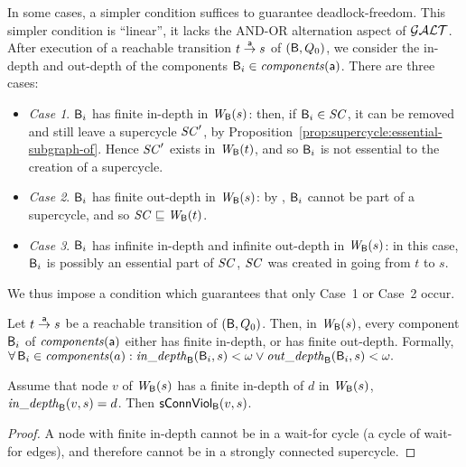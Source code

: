 In some cases, a simpler condition suffices to guarantee deadlock-freedom. This simpler condition is ``linear'', \ie it lacks the AND-OR alternation
aspect of $\GAO$. After execution of a reachable transition $t \goesto[\act] s$ of $(\B, Q_0)$, 
we consider the in-depth and out-depth of the components $\B_i \in \cmps{\act}$. There are three cases:
%
\begin{itemize}

\item \emph{Case 1}. \label{case:finite-in} $\B_i$ has finite in-depth in $\wfg{\B}{s}$: then, if $\B_i \in \SC$, it can be removed and still leave a
  supercycle $\SC'$, by Proposition~\ref{prop:supercycle:essential-subgraph-of}. Hence $\SC'$ exists in $\wfg{\B}{t}$, and so $\B_i$ is not essential
  to the creation of a supercycle.

\item \emph{Case 2}. \label{case:finite-out} $\B_i$ has finite out-depth in $\wfg{\B}{s}$: by , $\B_i$ cannot be
  part of a supercycle, and so $\SC \subg \wfg{\B}{t}$.

\item \emph{Case 3}. \label{case:infinite-both} $\B_i$ has infinite in-depth and infinite out-depth in $\wfg{\B}{s}$: in this case, $\B_i$ is possibly
  an essential part of $\SC$, \ie $\SC$ was created in going from $t$ to $s$.

\end{itemize}
We thus impose a condition which guarantees that only Case~1 or Case~2 occur. 



\begin{definition} \label{def:global:dfc}
Let $t \goesto[\act] s$ be a reachable transition of $(\B, Q_0)$.
Then, in $\wfg{\B}{s}$,  every component $\B_i$ of $\cmps{\act}$ either has finite in-depth, or has finite out-depth.
Formally, \\
\ind  $\fa \B_i \in \cmps{a}: \widepth{\B}{\B_i}{s} < \omega \lor \wodepth{\B}{\B_i}{s} < \omega.$
\end{definition}



\begin{proposition} \label{prop:indepth-finite-implies-scViol}
Assume that node $v$ of $\wfg{\B}{s}$ has a finite in-depth of $d$ in $\wfg{\B}{s}$, \ie 
$\widepth{\B}{v}{s} = d$. Then $\connViol{v}{s}$.
\end{proposition}
%
\begin{proof}
A node with finite in-depth cannot be in a wait-for cycle (\ie a cycle
of wait-for edges), and therefore cannot be in a strongly connected supercycle.
\end{proof}




